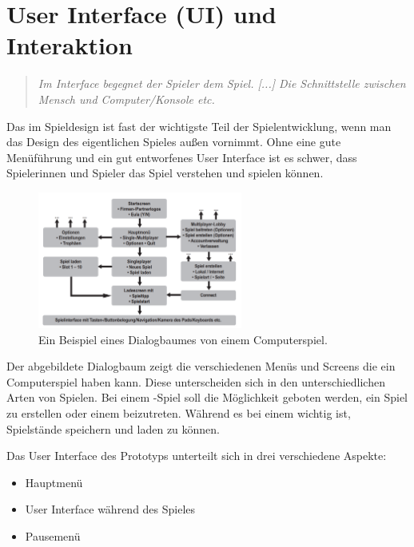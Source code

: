\chapter{User Interface (UI) und Interaktion}

\begin{quote}
\emph{\glqq Im Interface begegnet der Spieler dem Spiel. [...] Die Schnittstelle zwischen Mensch und Computer/Konsole etc.\grqq}~\cite[][Game Design und Produktion: Grundlagen, Anwendungen und Beispiele; p.~161]{GameDesign} \\ 
\end{quote}

Das  im Spieldesign ist fast der wichtigste Teil der Spielentwicklung, wenn man das Design des eigentlichen Spieles außen vornimmt. Ohne eine gute Menüführung und ein gut entworfenes User Interface ist es schwer, dass Spielerinnen und Spieler das Spiel verstehen und spielen können. 

\begin{figure}[H]
  \centering
  \includegraphics[width=0.6\textwidth]{chapters/03/images/Spielinterface.png}
  \caption{Ein Beispiel eines Dialogbaumes von einem Computerspiel.}
  \label{htl01}
\end{figure}

Der abgebildete Dialogbaum zeigt die verschiedenen Menüs und Screens die ein Computerspiel haben kann. Diese unterscheiden sich in den unterschiedlichen Arten von Spielen. Bei einem -Spiel soll die Möglichkeit geboten werden, ein Spiel zu erstellen oder einem beizutreten. Während es bei einem  wichtig ist, Spielstände speichern und laden zu können.

\pagebreak

Das User Interface des Prototyps unterteilt sich in drei verschiedene Aspekte:

\begin{itemize}
    \item Hauptmenü
    \item User Interface während des Spieles
    \item Pausemenü
\end{itemize}

